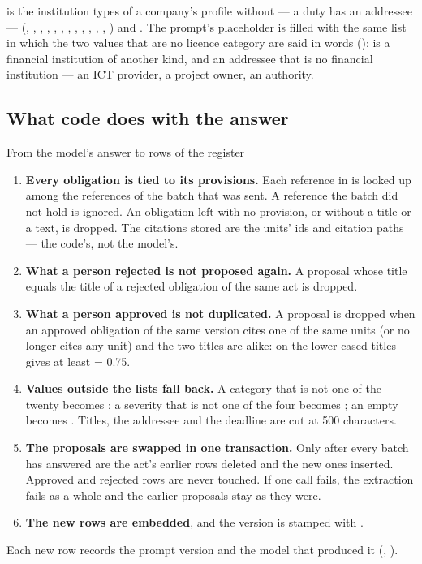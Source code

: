  is the institution types of a company's profile without
 --- a duty has an addressee --- (, ,
, , , ,
, , ,
, , , ) and .
The prompt's placeholder  is filled with the same list in which the
two values that are no licence category are said in words ():
 is a financial institution of another kind, and  an
addressee that is no financial institution --- an ICT provider, a project owner, an authority.

\subsection{What code does with the answer}\label{sec:obligations:answer}

\begin{codebox}{From the model's answer to rows of the register}
\begin{enumerate}
  \item \textbf{Every obligation is tied to its provisions.} Each reference in
     is looked up among the references of the batch that was sent. A
    reference the batch did not hold is ignored. An obligation left with no provision, or
    without a title or a text, is dropped. The citations stored are the units' ids and
    citation paths --- the code's, not the model's.
  \item \textbf{What a person rejected is not proposed again.} A proposal whose title equals
    the title of a rejected obligation of the same act is dropped.
  \item \textbf{What a person approved is not duplicated.} A proposal is dropped when an
    approved obligation of the same version cites one of the same units (or no longer cites
    any unit) and the two titles are alike:  on the lower-cased
    titles gives at least  = 0.75.
  \item \textbf{Values outside the lists fall back.} A category that is not one of the twenty
    becomes ; a severity that is not one of the four becomes ; an
    empty  becomes . Titles, the addressee and the deadline are cut
    at 500 characters.
  \item \textbf{The proposals are swapped in one transaction.} Only after every batch has
    answered are the act's earlier  rows deleted and the new ones inserted.
    Approved and rejected rows are never touched. If one call fails, the extraction fails as
    a whole and the earlier proposals stay as they were.
  \item \textbf{The new rows are embedded}, and the version is stamped with
    .
\end{enumerate}
Each new row records the prompt version and the model that produced it
(, ).
\end{codebox}

